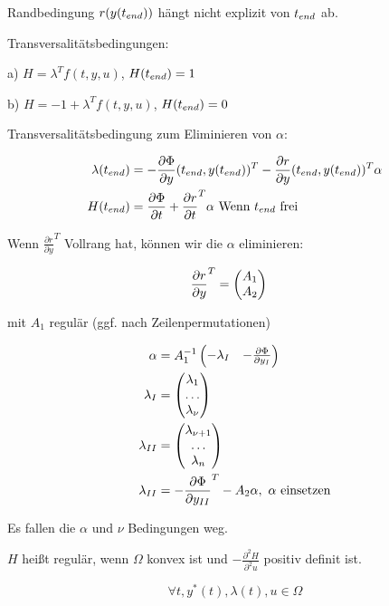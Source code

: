 Randbedingung $r(y({t_{end}}))$ hängt nicht explizit von ${t_{end}}$ ab.

Transversalitätsbedingungen:

\bitm
\item a) $H = \lambda^T f(t,y,u)$, $H({t_{end}})=1$
\item b) $H = -1 + \lambda^T f(t,y,u)$, $H({t_{end}}) = 0$
\eitm

Transversalitätsbedingung zum Eliminieren von $\alpha$:

\begin{align*}
\lambda({t_{end}}) &= -\frac{\partial \Phi}{\partial y} ({t_{end}}, y({t_{end}}))^T - \frac{\partial r}{\partial y} ({t_{end}}, y({t_{end}}))^T \alpha \\
H({t_{end}}) &= \frac{\partial \Phi}{\partial t} + \frac{\partial r}{\partial t}^T \alpha  \text{ Wenn ${t_{end}}$ frei} 
\end{align*}

Wenn $\frac{\partial r}{\partial y}^T$ Vollrang hat, können wir die $\alpha$ eliminieren:

\begin{align*}
\frac{\partial r}{\partial y}^T &= \begin{pmatrix} A_1 \\ A_2 \end{pmatrix}
\end{align*}

mit $A_1$ regulär (ggf. nach Zeilenpermutationen)

\begin{align*}
\alpha &= A_1^{-1} \begin{pmatrix} -\lambda_I & - \frac{\partial \Phi}{\partial y_I} \end{pmatrix} \\
\lambda_I &= \begin{pmatrix} \lambda_1 \\ \hdots \\ \lambda_\nu \end{pmatrix} \\
\lambda_{II} &= \begin{pmatrix} \lambda_{\nu+1} \\ \hdots \\ \lambda_n \end{pmatrix} \\
\lambda_{II} &= - \frac{\partial \Phi}{\partial y_{II}}^T - A_2 \alpha, \text{ $\alpha$ einsetzen} \\
\end{align*}

Es fallen die $\alpha$ und $\nu$ Bedingungen weg.


$H$ heißt regulär, wenn $\Omega$ konvex ist und $-\frac{\partial^2 H}{\partial^2 u}$ positiv definit ist.

\[ \forall t, y^*(t), \lambda(t), u\in \Omega \]

